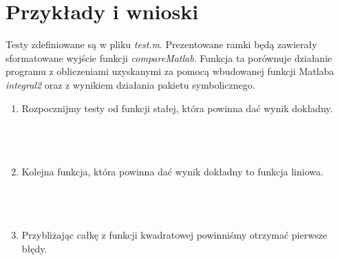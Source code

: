 \documentclass{article}
\begin{document}
\section{Przykłady i wnioski}
Testy zdefiniowane są w pliku \textit{test.m}. Prezentowane ramki będą zawierały sformatowane wyjście funkcji \textit{compareMatlab}. Funkcja ta porównuje działanie programu z obliczeniami uzyskanymi za pomocą wbudowanej funkcji Matlaba \textit{integral2} oraz z wynikiem działania pakietu symbolicznego.
\begin{enumerate}
\item Rozpocznijmy testy od funkcji stałej, która powinna dać wynik dokładny.\\\\
\noindent{}\\\\
\item Kolejna funkcja, która powinna dać wynik dokładny to funkcja liniowa.\\\\
\noindent{}\\\\
\item Przybliżając całkę z funkcji kwadratowej powinniśmy otrzymać pierwsze błędy.\\\\
\noindent{}
\end{enumerate}
\end{document}
